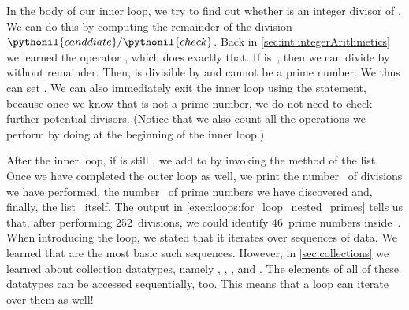 In the body of our inner loop, we try to find out whether  is an integer divisor of .
We can do this by computing the remainder of the division~$\pythonil{canddiate}/\pythonil{check}$.
Back in \cref{sec:int:integerArithmetics} we learned the  operator \expandafter\pythonilIdx{\%}, which does exactly that.
If  is~, then we can divide  by  without remainder.
Then,  is divisible by  and cannot be a prime number.
We thus can set .
We can also immediately exit the inner loop using the  statement, because once we know that  is not a prime number, we do not need to check further potential divisors.
(Notice that we also count all the  operations we perform by doing  at the beginning of the inner loop.)

After the inner loop, if  is still , we add  to  by invoking the  method of the list.
Once we have completed the outer loop as well, we print the number~ of divisions we have performed, the number~ of prime numbers we have discovered and, finally, the list~ itself.
The output in \cref{exec:loops:for_loop_nested_primes} tells us that, after performing 252~divisions, we could identify 46~prime numbers inside~.%
%
\FloatBarrier%
\endhsection%
%
%
\label{sec:loopsOverSequences}%
%
%
%
%
When introducing the  loop, we stated that it iterates over sequences of data.
We learned that  are the most basic such sequences.
However, in \cref{sec:collections} we learned about collection datatypes, namely , , , and .
The elements of all of these datatypes can be accessed sequentially, too.
This means that a  loop can iterate over them as well!

